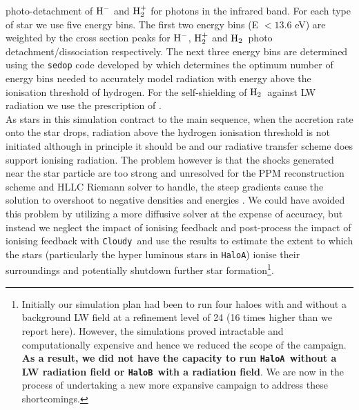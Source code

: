 \documentclass[twocolumn,iop,revtex4]{openjournal}
\newcommand{\cloudy}{\texttt{Cloudy~}}
\newcommand{\molH} {$\rm{H_2}$~}
\newcommand{\ha} {\texttt{HaloA~}}
\newcommand{\hb} {\texttt{HaloB~}}
\newcommand{\hac} {\texttt{HaloA}}
\begin{document}
photo-detachment of  $\rm{H^-}$ and $\rm{H_2^+}$ for photons in the infrared band. For each type of
star we use five energy bins. The first two energy bins (E $< 13.6$ eV) are weighted by the cross
section peaks for $\rm{H^-}$,  $\rm{H_2^+}$ and \molH photo detachment/dissociation respectively.
The next three energy bins are determined using the \texttt{sedop} code developed by
\cite{Mirocha_2012} which determines the optimum number of energy bins needed to
accurately model radiation with energy above the ionisation threshold of hydrogen. For the
self-shielding of \molH against LW radiation we use the prescription of \cite{Wolcott-Green_2011}.\\
\indent As stars in this simulation contract to the main sequence, when the accretion rate onto the
star drops, radiation above the hydrogen ionisation threshold is not initiated although in
principle it should be and our radiative transfer scheme does support ionising radiation. The
problem however is that the shocks generated near
the star particle are too strong and unresolved for the PPM reconstruction scheme and HLLC Riemann
solver to handle, the steep gradients cause the solution to overshoot to negative densities and
energies \citep[see][for details]{Enzo_2014}. We could have avoided this problem by utilizing a more
diffusive solver at the expense of accuracy, but instead
we neglect the impact of ionising feedback and post-process the impact of
ionising feedback with \cloudy and use the results to estimate the extent to which the stars
(particularly the hyper luminous stars in \hac) ionise their surroundings and potentially shutdown
further star formation\footnote{Initially our simulation plan had been to run four haloes with
  and without a background LW field at a refinement level of 24 (16 times higher than we report
  here). However, the simulations proved intractable and computationally expensive and hence we
  reduced the scope of the campaign. \textbf{As a result, we did not have the capacity to run
    \ha without a LW radiation field or \hb with a radiation field}.
  We are now in the process of undertaking a new
  more expansive campaign to address these shortcomings.}.
 
\end{document}
